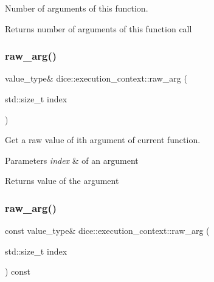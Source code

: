 Number of arguments of this function. 

\begin{DoxyReturn}{Returns}
number of arguments of this function call 
\end{DoxyReturn}
\mbox{\label{classdice_1_1execution__context_a1e5286fd9fec95590f2162699fe139ef}} 
\subsubsection{\texorpdfstring{raw\+\_\+arg()}{raw\_arg()}\hspace{0.1cm}{\footnotesize\ttfamily [1/2]}}
{\footnotesize\ttfamily value\+\_\+type\& dice\+::execution\+\_\+context\+::raw\+\_\+arg (\begin{DoxyParamCaption}\item[{std\+::size\+\_\+t}]{index }\end{DoxyParamCaption})\hspace{0.3cm}{\ttfamily [inline]}}



Get a raw value of ith argument of current function. 


\begin{DoxyParams}{Parameters}
{\em index} & of an argument\\
\hline
\end{DoxyParams}
\begin{DoxyReturn}{Returns}
value of the argument 
\end{DoxyReturn}
\mbox{\label{classdice_1_1execution__context_ac99b80fdabc62175ee5eb54968762631}} 
\subsubsection{\texorpdfstring{raw\+\_\+arg()}{raw\_arg()}\hspace{0.1cm}{\footnotesize\ttfamily [2/2]}}
{\footnotesize\ttfamily const value\+\_\+type\& dice\+::execution\+\_\+context\+::raw\+\_\+arg (\begin{DoxyParamCaption}\item[{std\+::size\+\_\+t}]{index }\end{DoxyParamCaption}) const\hspace{0.3cm}{\ttfamily [inline]}}



